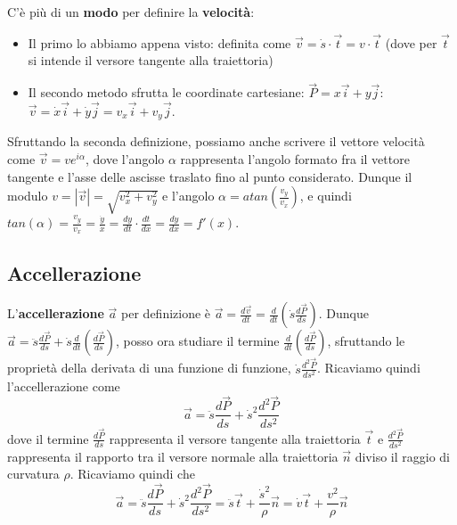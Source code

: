 \newline
C'è più di un \textbf{modo} per definire la \textbf{velocità}:
\begin{itemize}
    \item Il primo lo abbiamo appena visto: definita come $\vec{v} = \dot{s} \cdot \vec{t} = v \cdot \vec{t}$ (dove per $\vec{t}$ si intende il versore tangente alla traiettoria)
    \item Il secondo metodo sfrutta le coordinate cartesiane: $\vec{P} = x \vec{i} + y \vec{j}$: $\vec{v} = \dot{x} \vec{i} + \dot{y} \vec{j} = v_x \vec{i} + v_y \vec{j}$.
\end{itemize}
Sfruttando la seconda definizione, possiamo anche scrivere il vettore velocità come $\vec{v} = v e^{i \alpha}$, dove l'angolo $\alpha$ rappresenta l'angolo formato fra il vettore tangente e l'asse delle ascisse traslato fino al punto considerato. Dunque il modulo $v = |\vec{v}| = \sqrt{v_x^2 +v_y^2}$ e l'angolo $\alpha = atan\left(\frac{v_y}{v_x}\right)$, e quindi $tan(\alpha) = \frac{v_y}{v_x} = \frac{\dot{y}}{\dot{x}} = \frac{dy}{dt} \cdot \frac{dt}{dx} = \frac{dy}{dx} = f'(x)$.
\subsection{Accellerazione}
L'\textbf{accellerazione} $\vec{a}$ per definizione è $\vec{a} = \frac{d \vec{v}}{dt} = \frac{d}{dt}(\dot{s} \frac{d \vec{P}}{ds})$.\newline
Dunque $\vec{a} = \ddot{s} \frac{d \vec{P}}{ds} + \dot{s} \frac{d}{dt}\left(\frac{d \vec{P}}{ds}\right)$, posso ora studiare il termine $\frac{d}{dt}\left(\frac{d \vec{P}}{ds}\right)$, sfruttando le proprietà della derivata di una funzione di funzione, $\dot{s} \frac{d^2 \vec{P}}{ds^2}$.\newline
Ricaviamo quindi l'accellerazione come 
\[
    \vec{a} = \ddot{s} \frac{d \vec{P}}{ds} + \dot{s}^2 \frac{d^2 \vec{P}}{ ds^2}
\] 
dove il termine $\frac{d \vec{P}}{ds}$ rappresenta il versore tangente alla traiettoria $\vec{t}$ e $\frac{d^2 \vec{P}}{ ds^2}$ rappresenta il rapporto tra il versore normale alla traiettoria $\vec{n}$ diviso il raggio di curvatura $\rho$. Ricaviamo quindi che
\[
    \vec{a} = \ddot{s} \frac{d \vec{P}}{ds} + \dot{s}^2 \frac{d^2 \vec{P}}{ ds^2} = \ddot{s} \vec{t} + \frac{ \dot{s}^2}{\rho}\vec{n} = \dot{v} \vec{t} + \frac{v^2}{\rho}\vec{n}
\]
